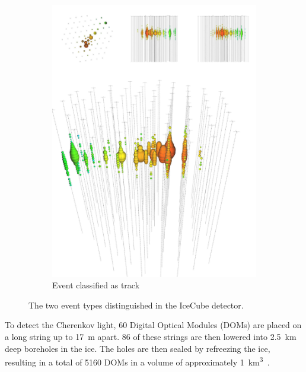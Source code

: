 \documentclass{thesis}
\begin{document}
\begin{figure}
\begin{center}
\begin{subfigure}{0.4\textwidth}
            \includegraphics[clip, trim=0cm 0cm 0cm 30cm, width=1\textwidth]{figures/track_event.pdf}
            \caption{Event classified as track} 
            \label{fig:events_track}
        \end{subfigure}
        \caption{The two event types distinguished in the IceCube detector.}
    \end{center}
\end{figure}

To detect the Cherenkov light, 60 Digital Optical Modules (DOMs) are placed on a long string up to \SI{17}{\metre} apart. 86 of these strings are then lowered
into \SI{2.5}{\km} deep boreholes in the ice. The holes are then sealed by refreezing the ice, resulting in a total of 5160 DOMs in a volume of approximately \SI{1}{\km^3}~\cite{weaverThesis}.
\end{document}
